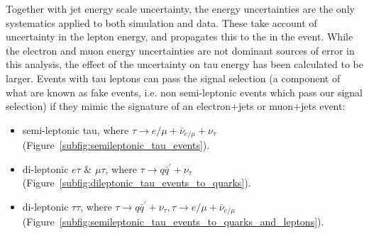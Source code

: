Together with jet energy scale uncertainty, the \met energy uncertainties are the only systematics applied to
both simulation and data. These take account of uncertainty in the lepton energy, and propagates this to the
\met in the event. While the electron and muon energy uncertainties are not dominant sources of error in this
analysis, the effect of the uncertainty on tau energy has been calculated to be larger. Events with tau
leptons can pass the signal selection (a component of what are known as fake events, i.e. non semi-leptonic
\ttbar events which pass our signal selection) if they mimic the signature of an electron+jets or muon+jets
\ttbar event:

\begin{itemize}
 \item semi-leptonic tau, where $\tau \rightarrow e/\mu + \bar{\nu}_{e/\mu} + \nu_{\tau}$
 (Figure~\ref{subfig:semileptonic_tau_events}).
 \item di-leptonic $e\tau$ \& $\mu\tau$, where $\tau \rightarrow q\bar{q}^{'} + \nu_\tau$
 (Figure~\ref{subfig:dileptonic_tau_events_to_quarks}).
 \item di-leptonic $\tau\tau$, where $\tau \rightarrow q\bar{q}^{'} + \nu_\tau, \tau \rightarrow e/\mu
 + \bar{\nu}_{e/\mu}$ (Figure~\ref{subfig:semileptonic_tau_events_to_quarks_and_leptons}).
\end{itemize}

